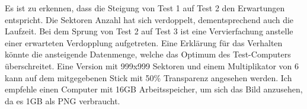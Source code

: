 Es ist zu erkennen, dass die Steigung von Test 1 auf Test 2 den Erwartungen entspricht. Die Sektoren Anzahl hat sich verdoppelt, dementsprechend auch die Laufzeit. Bei dem Sprung von Test 2 auf Test 3 ist eine Vervierfachung anstelle einer erwarteten Verdopplung aufgetreten. Eine Erklärung für das Verhalten könnte die ansteigende Datenmenge, welche das Optimum des Test-Computers überschreitet. Eine Version mit 999x999 Sektoren und einem Multiplikator von 6 kann auf dem mitgegebenen Stick mit 50\% Transparenz angesehen werden. Ich empfehle einen Computer mit 16GB Arbeitsspeicher, um sich das Bild anzusehen, da es 1GB als PNG verbraucht.
\newline